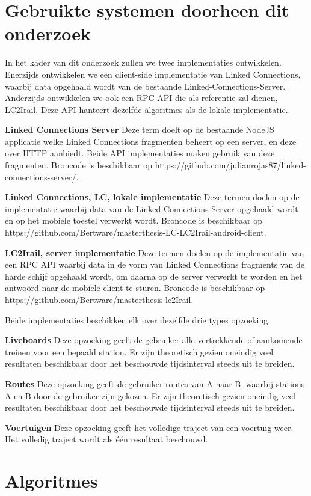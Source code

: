 \section{Gebruikte systemen doorheen dit onderzoek}
In het kader van dit onderzoek zullen we twee implementaties ontwikkelen. Enerzijds ontwikkelen we een client-side implementatie van Linked Connections, waarbij data opgehaald wordt van de bestaande Linked-Connections-Server. Anderzijds ontwikkelen we ook een RPC API die als referentie zal dienen, LC2Irail. Deze API hanteert dezelfde algoritmes als de lokale implementatie.

\textbf{Linked Connections Server} Deze term doelt op de bestaande NodeJS applicatie welke Linked Connections fragmenten beheert op een server, en deze over HTTP aanbiedt. Beide API implementaties maken gebruik van deze fragmenten. Broncode is beschikbaar op https://github.com/julianrojas87/linked-connections-server/.

\textbf{Linked Connections, LC, lokale implementatie} Deze termen doelen op de implementatie waarbij data van de Linked-Connections-Server opgehaald wordt en op het mobiele toestel verwerkt wordt. Broncode is beschikbaar op https://github.com/Bertware/masterthesis-LC-LC2Irail-android-client.

\textbf{LC2Irail, server implementatie} Deze termen doelen op de implementatie van een RPC API waarbij data in de vorm van Linked Connections fragments van de harde schijf opgehaald wordt, om daarna op de server verwerkt te worden en het antwoord naar de mobiele client te sturen. Broncode is beschikbaar op https://github.com/Bertware/masterthesis-lc2Irail.

Beide implementaties beschikken elk over dezelfde drie types opzoeking.

\textbf{Liveboards} Deze opzoeking geeft de gebruiker alle vertrekkende of aankomende treinen voor een bepaald station. Er zijn theoretisch gezien oneindig veel resultaten beschikbaar door het beschouwde tijdsinterval steeds uit te breiden.

\textbf{Routes} Deze opzoeking geeft de gebruiker routes van A naar B, waarbij stations A en B door de gebruiker zijn gekozen. Er zijn theoretisch gezien oneindig veel resultaten beschikbaar door het beschouwde tijdsinterval steeds uit te breiden.

\textbf{Voertuigen} Deze opzoeking geeft het volledige traject van een voertuig weer. Het volledig traject wordt als één resultaat beschouwd.

\section{Algoritmes}
\label{sec:algoritmes}
